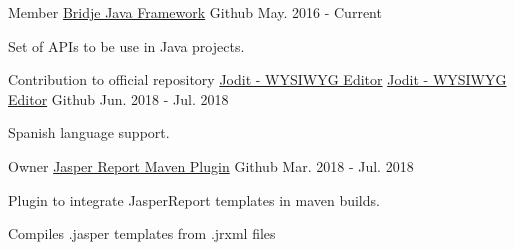 
\begin{cventries}

  \cventry
    {Member} %
    {\href{https://github.com/touwolf/bridje-framework}{Bridje Java Framework}} %
    {\faGithubSquare\acvHeaderIconSep Github} %
    {May. 2016 - Current} %
    {
      \begin{cvitems} %
        \item {Set of APIs to be use in Java projects.}
      \end{cvitems}
    }

  \cventry
    {Contribution to official repository \href{https://github.com/xdan/jodit}{Jodit - WYSIWYG Editor}} %
    {\href{https://github.com/miche-atucha/jodit}{Jodit - WYSIWYG Editor}} %
    {\faGithubSquare\acvHeaderIconSep Github} %
    {Jun. 2018 - Jul. 2018} %
    {
      \begin{cvitems} %
        \item {Spanish language support.}
      \end{cvitems}
    }

  \cventry
    {Owner} %
    {\href{https://github.com/miche-atucha/jasperreport-maven-plugin}{Jasper Report Maven Plugin}} %
    {\faGithubSquare\acvHeaderIconSep Github} %
    {Mar. 2018 - Jul. 2018} %
    {
      \begin{cvitems} %
        \item {Plugin to integrate JasperReport templates in maven builds.}
        \item {Compiles .jasper templates from .jrxml files}
      \end{cvitems}
    }


\end{cventries}
